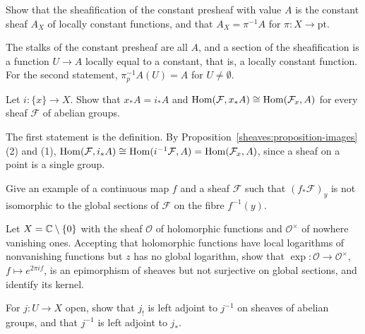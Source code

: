 \begin{exercise}\label{sheaves:exercise-constant-sheaf}
Show that the sheafification of the constant presheaf with value $A$ is the constant sheaf $A_X$ of locally constant functions, and that $A_X = \pi^{-1}A$ for
$\pi \colon X \to \mathrm{pt}$.
\end{exercise}

\begin{solution}
The stalks of the constant presheaf are all $A$, and a section of the sheafification is a function $U \to A$ locally equal to a constant, that is, a locally constant function.
For the second statement, $\pi_p^{-1}A(U) = A$ for $U \neq \emptyset$.
\end{solution}

\begin{exercise}\label{sheaves:exercise-skyscraper-adjunction}
Let $i \colon \{x\} \to X$. Show that $x_*A = i_*A$ and $\operatorname{Hom}(\mathcal{F}, x_*A) \cong \operatorname{Hom}(\mathcal{F}_x, A)$ for every sheaf $\mathcal{F}$ of abelian groups.
\end{exercise}

\begin{solution}
The first statement is the definition. By Proposition~\ref{sheaves:proposition-images}(2) and (1),
$\operatorname{Hom}(\mathcal{F}, i_*A) \cong \operatorname{Hom}(i^{-1}\mathcal{F}, A) = \operatorname{Hom}(\mathcal{F}_x, A)$, since a sheaf on a point is a single group.
\end{solution}

\begin{exercise}\label{sheaves:exercise-direct-image-stalk}
Give an example of a continuous map $f$ and a sheaf $\mathcal{F}$ such that $(f_*\mathcal{F})_y$ is not isomorphic to the global sections of $\mathcal{F}$ on the fibre $f^{-1}(y)$.
\end{exercise}

\begin{exercise}\label{sheaves:exercise-epi-not-surjective}
Let $X = \mathbb{C} \setminus \{0\}$ with the sheaf $\mathcal{O}$ of holomorphic functions and $\mathcal{O}^\times$ of nowhere vanishing ones. Accepting that holomorphic functions have local
logarithms of nonvanishing functions but $z$ has no global logarithm, show that $\exp \colon \mathcal{O} \to \mathcal{O}^\times$, $f \mapsto e^{2\pi i f}$, is an epimorphism of sheaves but not
surjective on global sections, and identify its kernel.
\end{exercise}

\begin{exercise}\label{sheaves:exercise-restriction-open-adjoint}
For $j \colon U \to X$ open, show that $j_!$ is left adjoint to $j^{-1}$ on sheaves of abelian groups, and that $j^{-1}$ is left adjoint to $j_*$.
\end{exercise}
